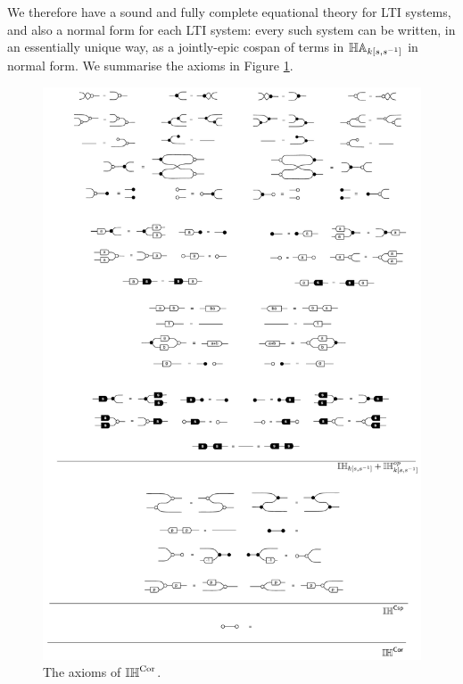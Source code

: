 %

We therefore have a sound and fully complete equational theory for LTI systems,
and also a normal form for each LTI system: every such system can be written, in
an essentially unique way, as a jointly-epic cospan of terms in $\mathbb{HA}_{k[s,s^{-1}]}$ in
normal form. We summarise the axioms in Figure \ref{fig.ihcoraxioms}.

\begin{figure} \label{fig.ihcoraxioms}
  \includegraphics[width=.9\textwidth]{pics/ihcor.pdf}
  \caption{The axioms of $\mathbb{IH}^{\mathrm{Cor}}$.}
\end{figure}

